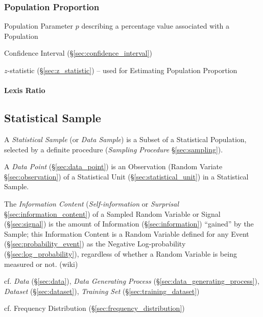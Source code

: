 \subsubsection{Population Proportion}\label{sec:proportion}

Population Parameter $p$ describing a percentage value associated with a
Population

\fist Confidence Interval (\S\ref{sec:confidence_interval})

$z$-statistic (\S\ref{sec:z_statistic}) -- used for Estimating Population
Proportion



\paragraph{Lexis Ratio}\label{sec:lexis_ratio}\hfill



\subsection{Statistical Sample}\label{sec:sample}

A \emph{Statistical Sample} (or \emph{Data Sample}) is a Subset of a Statistical
Population, selected by a definite procedure (\emph{Sampling Procedure}
\S\ref{sec:sampling}).

\fist A \emph{Data Point} (\S\ref{sec:data_point}) is an Observation (Random
Variate \S\ref{sec:observation}) of a Statistical Unit
(\S\ref{sec:statistical_unit}) in a Statistical Sample.

The \emph{Information Content} (\emph{Self-information} or \emph{Surprisal}
\S\ref{sec:information_content}) of a Sampled Random Variable or Signal
(\S\ref{sec:signal}) is the amount of Information (\S\ref{sec:information})
``gained'' by the Sample; this Information Content is a Random Variable defined
for any Event (\S\ref{sec:probability_event}) as the Negative Log-probability
(\S\ref{sec:log_probability}), regardless of whether a Random Variable is being
measured or not. (wiki)

\fist cf. \emph{Data} (\S\ref{sec:data}), \emph{Data Generating Process}
(\S\ref{sec:data_generating_process}), \emph{Dataset} (\S\ref{sec:dataset}),
\emph{Training Set} (\S\ref{sec:training_dataset})

\fist cf. Frequency Distribution (\S\ref{sec:frequency_distribution})

